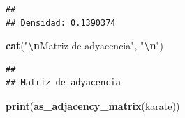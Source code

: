 \documentclass[
]{article}
\newenvironment{Shaded}{\begin{snugshade}}{\end{snugshade}}
\newcommand{\FunctionTok}[1]{\textcolor[rgb]{0.13,0.29,0.53}{\textbf{#1}}}
\newcommand{\NormalTok}[1]{#1}
\newcommand{\SpecialCharTok}[1]{\textcolor[rgb]{0.81,0.36,0.00}{\textbf{#1}}}
\newcommand{\StringTok}[1]{\textcolor[rgb]{0.31,0.60,0.02}{#1}}
\begin{document}
\begin{verbatim}
## 
## Densidad: 0.1390374
\end{verbatim}

\begin{Shaded}
\begin{Highlighting}[]
\FunctionTok{cat}\NormalTok{(}\StringTok{"}\SpecialCharTok{\textbackslash{}n}\StringTok{Matriz de adyacencia"}\NormalTok{, }\StringTok{"}\SpecialCharTok{\textbackslash{}n}\StringTok{"}\NormalTok{)}
\end{Highlighting}
\end{Shaded}

\begin{verbatim}
## 
## Matriz de adyacencia
\end{verbatim}

\begin{Shaded}
\begin{Highlighting}[]
\FunctionTok{print}\NormalTok{(}\FunctionTok{as\_adjacency\_matrix}\NormalTok{(karate))}
\end{Highlighting}
\end{Shaded}
\end{document}
